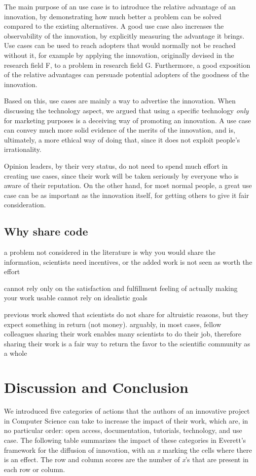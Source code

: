 \documentclass[12pt]{article}
\begin{document}
The main purpose of an use case is to introduce the relative advantage of an innovation, by demonstrating how much better a problem can be solved compared to the existing alternatives. A good use case also increases the observability of the innovation, by explicitly measuring the advantage it brings. Use cases can be used to reach adopters that would normally not be reached without it, for example by applying the innovation, originally devised in the research field F, to a problem in research field G. Furthermore, a good exposition of the relative advantages can persuade potential adopters of the goodness of the innovation.

Based on this, use cases are mainly a way to advertise the innovation. When discussing the technology aspect, we argued that using a specific technology \emph{only} for marketing purposes is a deceiving way of promoting an innovation. A use case can convey much more solid evidence of the merits of the innovation, and is, ultimately, a more ethical way of doing that, since it does not exploit people's irrationality.

Opinion leaders, by their very status, do not need to spend much effort in creating use cases, since their work will be taken seriously by everyone who is aware of their reputation. On the other hand, for most normal people, a great use case can be as important as the innovation itself, for getting others to give it fair consideration.

\subsection{Why share code}
\label{sec:org1e4579d}
a problem not considered in the literature is why you would share the information, scientists need incentives, or the added work is not seen as worth the effort

cannot rely only on the satisfaction and fulfillment feeling of actually making your work usable
cannot rely on idealistic goals

previous work showed that scientists do not share for altruistic reasons, but they expect something in return (not money). arguably, in most cases, fellow colleagues sharing their work enables many scientists to do their job, therefore sharing their work is a fair way to return the favor to the scientific community as a whole


\section{Discussion and Conclusion}
\label{sec:org473842d}
We introduced five categories of actions that the authors of an innovative project in Computer Science can take to increase the impact of their work, which are, in no particular order: open access, documentation, tutorials, technology, and use case. The following table summarizes the impact of these categories in Everett's framework for the diffusion of innovation, with an \emph{x} marking the cells where there is an effect. The row and column scores are the number of \emph{x}'s that are present in each row or column.
\end{document}
